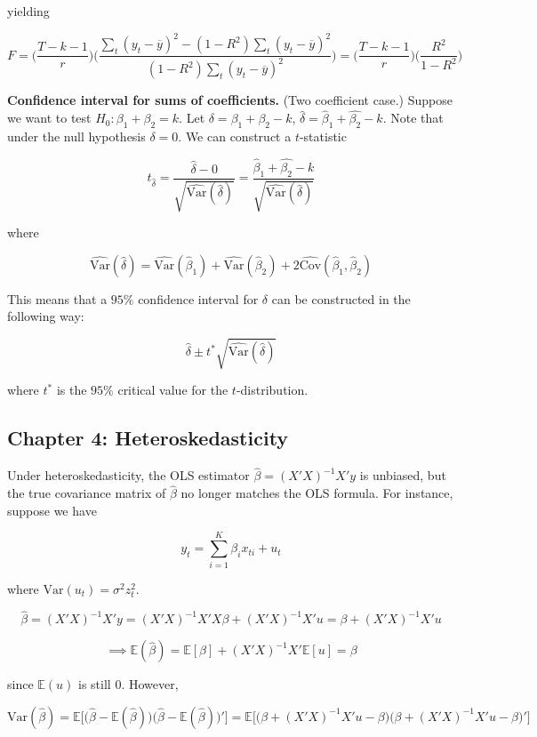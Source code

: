 \documentclass{article}
\newcommand{\E}{\mathbb{E}}
\newcommand{\Var}{\mathrm{Var}}
\newcommand{\Cov}{\mathrm{Cov}}
\begin{document}
yielding

\[
F = \bigg( \frac{T - k - 1}{r} \bigg) \bigg( \frac{\sum_t(y_t - \overline{y})^2 - (1 - R^2)\sum_t(y_t - \overline{y})^2}{(1 - R^2)\sum_t(y_t - \overline{y})^2} \bigg) = \bigg( \frac{T - k - 1}{r} \bigg) \bigg( \frac{R^2}{1 - R^2} \bigg)
\]

\textbf{Confidence interval for sums of coefficients.} (Two coefficient case.) Suppose we want to test \(H_0: \beta_1 + \beta_2 = k\). Let \(\delta = \beta_1 + \beta_2 -k\), \(\hat{\delta} = \hat{\beta}_1 + \hat{\beta_2} -k\). Note that under the null hypothesis \(\delta = 0\). We can construct a \(t\)-statistic

\[
t_{\hat{\delta}} = \frac{\hat{\delta}  - 0}{\sqrt{\hat{\Var}(\hat{\delta})}} = \frac{\hat{\beta}_1 + \hat{\beta_2} -k}{\sqrt{\hat{\Var}(\hat{\delta})}}
\]

where

\[
\hat{\Var}(\hat{\delta}) = \hat{\Var}(\hat{\beta}_1) + \hat{\Var}(\hat{\beta}_2) + 2 \hat{\Cov}(\hat{\beta}_1, \hat{\beta}_2) 
\]

This means that a \(95\%\) confidence interval for \(\delta\) can be constructed in the following way:

\[
\hat{\delta} \pm t^* \sqrt{\hat{\Var}(\hat{\delta})}
\]

where \(t^*\) is the \(95\%\) critical value for the \(t\)-distribution.

\subsection{Chapter 4: Heteroskedasticity}

Under heteroskedasticity, the OLS estimator \(\hat{\beta} = (X'X)^{-1}X'y\) is unbiased, but the true covariance matrix of \(\hat{\beta}\) no longer matches the OLS formula. For instance, suppose we have

\[
y_t = \sum_{i=1}^K \beta_i x_{ti} + u _t
\]

where \(\Var(u_t) = \sigma^2 z_t^2\).

\[
\hat{\beta} = (X'X)^{-1}X'y = (X'X)^{-1}X'X\beta + (X'X)^{-1}X'u = \beta + (X'X)^{-1}X'u 
\]


\[
\implies \E(\hat{\beta}) = \E[\beta] + (X'X)^{-1}X'\E[u] = \beta
\]

since \(\E(u)\) is still 0. However,

\[
\Var(\hat{\beta}) = \E\big[ \big(\hat{\beta} - \E(\hat{\beta}) \big) \big(\hat{\beta} - \E(\hat{\beta}) \big)' \big] = \E \big[\big(\beta + (X'X)^{-1}X'u - \beta \big)\big(\beta + (X'X)^{-1}X'u - \beta \big)' \big]
\]
\end{document}
